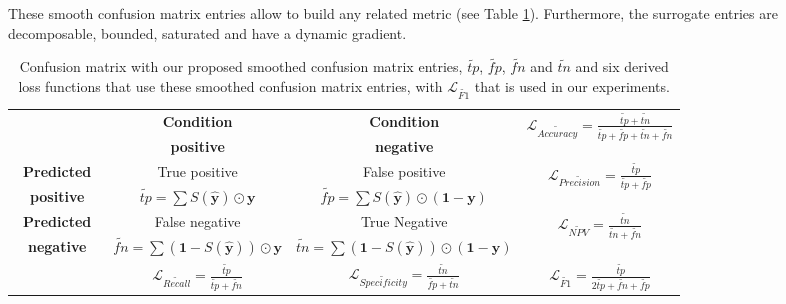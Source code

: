 These smooth confusion matrix entries allow to build any related metric (see Table \ref{tab:confusion-matrix}). Furthermore, the surrogate entries are decomposable, bounded, saturated and have a dynamic gradient.

\begin{table}[]
\label{tab:confusion-matrix}
\caption{Confusion matrix with our proposed smoothed confusion matrix entries, $\widetilde{\mathit{tp}}$, $\widetilde{\mathit{fp}}$, $\widetilde{\mathit{fn}}$ and $\widetilde{\mathit{tn}}$ and six derived loss functions that use these smoothed confusion matrix entries, with $\mathcal{L}_{\widetilde{\mathit{F1}}}$ that is used in our experiments.}
\def\arraystretch{1.1}
\begin{tabular}{|c||c|c||c|} \cline{2-4}
\multicolumn{1}{l|}{} & \textbf{Condition} & \textbf{Condition} & \multirow{2}{*}{$\mathcal{L}_{\widetilde{\mathit{Accuracy}}}= \frac{\widetilde{\mathit{tp}} + \widetilde{\mathit{tn}}}{\widetilde{\mathit{tp}} + \widetilde{\mathit{fp}} + \widetilde{\mathit{tn}} + \widetilde{\mathit{fn}}}$} \\
\multicolumn{1}{l|}{} & \textbf{positive} &  \textbf{negative} & \\ \hline \hline
\textbf{~Predicted~} & True positive & False positive & \multirow{2}{*}{$\mathcal{L}_{\widetilde{\mathit{Precision}}}= \frac{\widetilde{\mathit{tp}}}{\widetilde{\mathit{tp}} + \widetilde{\mathit{fp}}}$} \\
\textbf{positive} & $\widetilde{\mathit{tp}}=\sum S(\hat{\mathbf{y}}) \odot \mathbf{y}$ & $\widetilde{\mathit{fp}}= \sum S(\hat{\mathbf{y}}) \odot (\mathbf{1} - \mathbf{y})$ & \\ \hline
\textbf{Predicted} & False negative & True Negative & \multirow{2}{*}{$\mathcal{L}_{\widetilde{\mathit{NPV}}}= \frac{\widetilde{\mathit{tn}}}{\widetilde{\mathit{tn}} + \widetilde{\mathit{fn}}}$} \\
\textbf{negative} & $\widetilde{\mathit{fn}}= \sum (\mathbf{1} - S(\hat{\mathbf{y}})) \odot \mathbf{y}$ & $\widetilde{\mathit{tn}}= \sum (\mathbf{1} - S(\hat{\mathbf{y}})) \odot (\mathbf{1} - \mathbf{y})$ & \\ \hline \hline
\multicolumn{1}{l|}{} & \multirow{2}{*}{\hspace{1.2em}$\mathcal{L}_{\widetilde{\mathit{Recall}}}= \frac{\widetilde{\mathit{tp}}}{\widetilde{\mathit{tp}} + \widetilde{\mathit{fn}}}$\hspace{1.2em}}& \multirow{2}{*}{$\mathcal{L}_{\widetilde{\mathit{Specificity}}}= \frac{\widetilde{\mathit{tn}}}{\widetilde{\mathit{fp}} + \widetilde{\mathit{tn}}}$} & \multirow{2}{*}{$\mathcal{L}_{\widetilde{\mathit{F1}}}= \frac{\widetilde{\mathit{tp}}}{2 \widetilde{\mathit{tp}}+ \widetilde{\mathit{fn}}+ \widetilde{\mathit{fp}}}$} \\
\multicolumn{1}{l|}{} & & & \\
\cline{2-4}
\end{tabular}%
\end{table}


